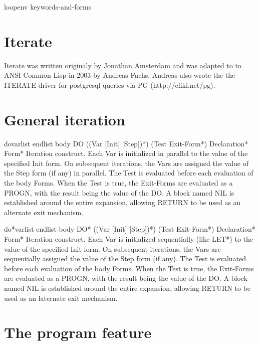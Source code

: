 \documentclass[10pt,english]{book}
\begin{document}
\begin{macro}{loop}{\env env \rest keywords-and-forms}
  
\end{macro}

\section{Iterate}
\label{sec:iterate}

Iterate was written originaly by Jonathan Amsterdam and was adapted to
to ANSI Common Lisp in 2003 by Andreas Fuchs. Andreas also wrote the
the ITERATE driver for postgresql queries via PG (http://cliki.net/pg).

\section{General iteration}
\label{sec:general-iteration}

\begin{macro}{do}{varlist endlist \body body}
  DO ({(Var [Init] [Step])}*) (Test Exit-Form*) Declaration* Form*
  Iteration construct. Each Var is initialized in parallel to the value of the
  specified Init form. On subsequent iterations, the Vars are assigned the
  value of the Step form (if any) in parallel. The Test is evaluated before
  each evaluation of the body Forms. When the Test is true, the Exit-Forms
  are evaluated as a PROGN, with the result being the value of the DO. A block
  named NIL is established around the entire expansion, allowing RETURN to be
  used as an alternate exit mechanism.
\end{macro}

\begin{macro}{do*}{varlist endlist \body body}
  DO* ({(Var [Init] [Step])}*) (Test Exit-Form*) Declaration* Form*
  Iteration construct. Each Var is initialized sequentially (like LET*) to the
  value of the specified Init form. On subsequent iterations, the Vars are
  sequentially assigned the value of the Step form (if any). The Test is
  evaluated before each evaluation of the body Forms. When the Test is true,
  the Exit-Forms are evaluated as a PROGN, with the result being the value
  of the DO. A block named NIL is established around the entire expansion,
  allowing RETURN to be used as an laternate exit mechanism.
\end{macro}

\section{The program feature}
\label{sec:program-feature}
\end{document}
